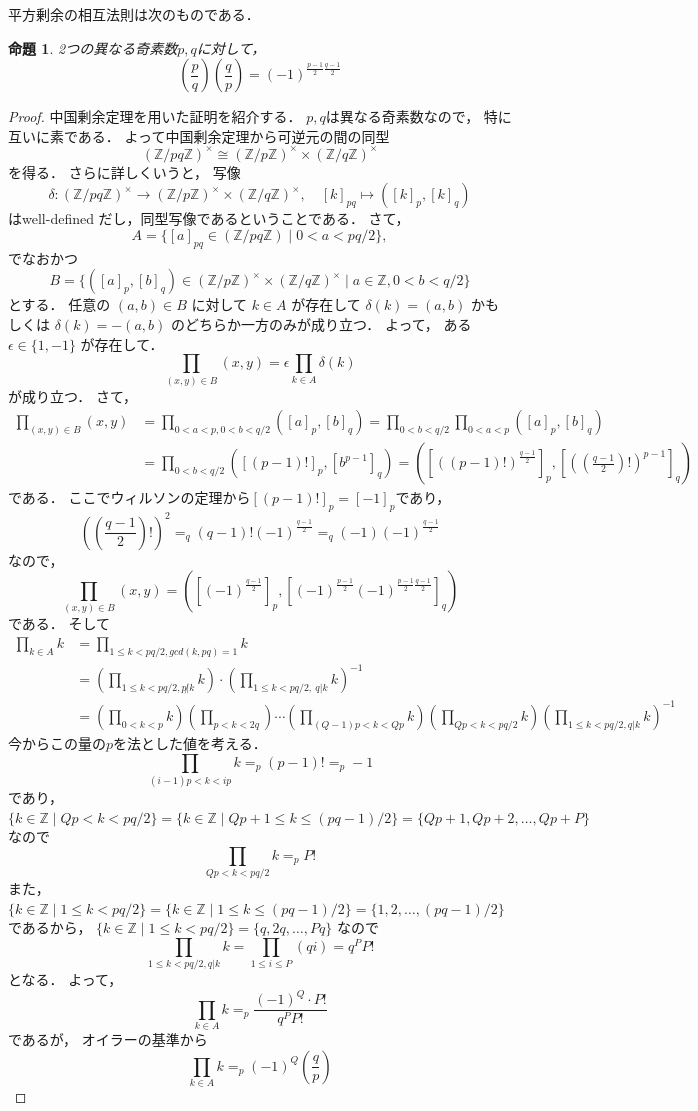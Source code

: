 \documentclass[leqno, 12pt]{jsarticle}
\newtheorem{prop}[thm]{命題}
\newcommand{\zz}{\mathbb{Z}}
\newcommand{\leg}[2]{\left(\frac{#1}{#2}\right)}
\begin{document}
平方剰余の相互法則は次のものである．
\begin{prop}
2つの異なる奇素数$p,q$に対して，
\[
\leg{p}{q}\leg{q}{p}=(-1)^{\frac{p-1}{2}\frac{q-1}{2}}
\]
\end{prop}
\begin{proof}
中国剰余定理を用いた証明を紹介する．
$p, q$は異なる奇素数なので，
特に互いに素である．
よって中国剰余定理から可逆元の間の同型
\[
(\zz/pq\zz)^{\times}\cong (\zz/p\zz)^{\times}\times (\zz/q\zz)^{\times}
\]
を得る．
さらに詳しくいうと，
写像
\[
\delta\colon (\zz/pq\zz)^{\times}\to (\zz/p\zz)^{\times}\times (\zz/q\zz)^{\times},\quad [k]_{pq}\mapsto ([k]_p, [k]_q)
\]
はwell-defined だし，同型写像であるということである．
さて，
\[
A=\{[a]_{pq}\in (\zz/pq\zz)\mid 0<a<pq/2\}, 
\]
でなおかつ
\[
B=\{([a]_p, [b]_q)\in  (\zz/p\zz)^{\times}\times (\zz/q\zz)^{\times} \mid a\in \zz, 0<b<q/2\}
\]
とする．
任意の
$(a, b)\in  B$
に対して
$k\in A$
が存在して
$\delta(k)=(a, b)$
かもしくは
$\delta(k)=-(a, b)$
のどちらか一方のみが成り立つ．
よって，
ある$\epsilon\in \{1, -1\}$
が存在して．
\[
\prod_{(x, y)\in B}(x, y)=\epsilon\prod_{k\in A}\delta(k)
\]
が成り立つ．
さて，
\begin{align*}
\prod_{(x, y)\in B}(x, y)&=\prod_{0<a<p, 0<b<q/2}([a]_p, [b]_q)
=\prod_{0<b<q/2}\prod_{0<a<p}([a]_p, [b]_q)
\\
&=\prod_{0<b<q/2}([(p-1)!]_p, [b^{p-1}]_q)
=\left(\left[((p-1)!)^{\frac{q-1}{2}}\right]_p, \left[\left((\frac{q-1}{2})!\right)^{p-1}\right]_q\right)
\end{align*}
である．
ここでウィルソンの定理から$[(p-1)!]_p=[-1]_p$であり，
\[
\left(\left(\frac{q-1}{2}\right)!\right)^2=_q(q-1)!(-1)^{\frac{q-1}{2}}=_q(-1)(-1)^{\frac{q-1}{2}}
\]
なので，
\begin{equation}\label{eq:daiji}
\prod_{(x, y)\in B}(x, y)=
\left(\left[(-1)^{\frac{q-1}{2}}\right]_p, 
\left[(-1)^{\frac{p-1}{2}}(-1)^{\frac{p-1}{2}\frac{q-1}{2}}\right]_q\right)
\end{equation}
である．
そして
\begin{align*}
\prod_{k\in A}k&=\prod_{1\le k<pq/2, gcd(k, pq)=1}k\\
&=\left(\prod_{1\le k<pq/2, p\not| k}k\right)\cdot 
\left(\prod_{1\le k<pq/2,\ q|k}k\right)^{-1}\\
&=\left(\prod_{0<k<p}k\right)\left(\prod_{p<k<2q}\right)\cdots \left(\prod_{(Q-1)p<k<Qp}k\right)\left(\prod_{Qp<k<pq/2}k\right)\left(\prod_{1\le k<pq/2, q|k}k\right)^{-1}
\end{align*}
今からこの量の$p$を法とした値を考える．
\[
\prod_{(i-1)p<k<ip}k=_p (p-1)!=_p-1
\]
であり，
$\{k\in \zz\mid Qp<k<pq/2 \}=\{k\in \zz\mid Qp+1\le k\le (pq-1)/2\}=\{Qp+1, Qp+2, \dots, Qp+P\}$
なので
\[
\prod_{Qp<k<pq/2}k=_pP!
\]
また，
$\{k\in \zz\mid 1\le k<pq/2\}=\{k\in \zz\mid 1\le k\le (pq-1)/2\}
=\{1,2,\dots, (pq-1)/2\}$
であるから，
$\{k\in \zz\mid 1\le k<pq/2\}=\{q, 2q, \dots, Pq\}$
なので
\[
\prod_{1\le k<pq/2, q|k}k=\prod_{1\le i\le P}(qi)=q^{P}P!
\]
となる．
よって，
\[
\prod_{k\in A}k=_p\frac{(-1)^Q\cdot P!}{q^{P}P!}
\]
であるが，
オイラーの基準から
\[
\prod_{k\in A}k=_p(-1)^Q\leg{q}{p}
\]


\end{proof}
\end{document}
